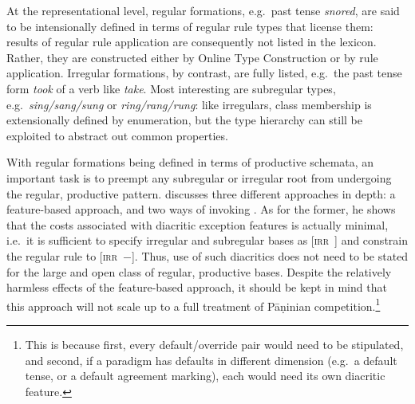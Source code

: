 \documentclass[output=paper,biblatex,babelshorthands,newtxmath,draftmode,colorlinks,citecolor=brown]{langscibook}
\begin{document}
\begin{exe}
\begin{xlist}
At the representational level, regular formations, e.g.\ past tense
\textit{snored}, are said to be intensionally defined in terms of
regular rule types that license them: results of regular rule
application are consequently not listed in the lexicon. Rather, they are
constructed either by Online Type Construction or by rule application.
Irregular formations, by contrast, are fully listed, e.g.\ the past
tense form \textit{took} of a verb like \textit{take}. Most
interesting are subregular types, e.g.\ \textit{sing/sang/sung} or
\textit{ring/rang/rung}: like irregulars, class membership is
extensionally defined by enumeration, but the type hierarchy can still
be exploited to abstract out common properties.

With regular formations being defined in terms of productive schemata,
an important task is to preempt any subregular or irregular root from
undergoing the regular, productive pattern. \citet{Koenig99} discusses
three different approaches in depth: a feature-based approach, and two
ways of invoking . As for the former, he shows that
the costs associated with diacritic exception features is actually
minimal, i.e.\ it is sufficient to specify irregular and subregular
bases as \textsc{[irr~\mathplus{}]} and constrain the regular rule to
\textsc{[irr~$-$]}. Thus, use of such diacritics does not need to be
stated for the large and open class of regular, productive
bases. Despite the relatively harmless effects of the feature-based
approach, it should be kept in mind that this approach will not scale
up to a full treatment of Pāṇinian competition.\footnote{This is
  because first, every default/override pair would need to be
  stipulated, and second, if a paradigm has defaults in different
  dimension (e.g.\ a default tense, or a default agreement marking),
  each would need its own diacritic feature.}


\end{xlist}
\end{exe}
\end{document}
